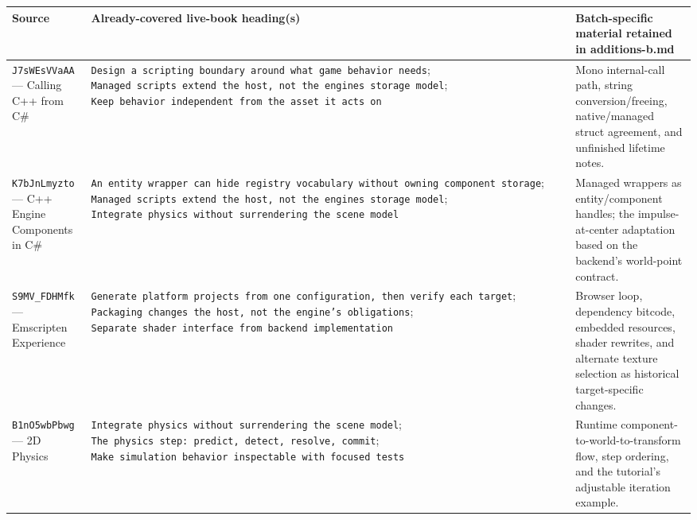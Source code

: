 {\def\LTcaptype{none} %
\begin{longtable}[]{@{}
  >{\raggedright\arraybackslash}p{}
  >{\raggedright\arraybackslash}p{}
  >{\raggedright\arraybackslash}p{}@{}}
\toprule\noalign{}
\begin{minipage}[b]{\linewidth}\raggedright
Source
\end{minipage} & \begin{minipage}[b]{\linewidth}\raggedright
Already-covered live-book heading(s)
\end{minipage} & \begin{minipage}[b]{\linewidth}\raggedright
Batch-specific material retained in additions-b.md
\end{minipage} \\
\midrule\noalign{}
\endhead
\bottomrule\noalign{}
\endlastfoot
\texttt{J7sWEsVVaAA} --- Calling C++ from C\# & \texttt{Design\ a\ scripting\ boundary\ around\ what\ game\ behavior\ needs}; \texttt{Managed\ scripts\ extend\ the\ host,\ not\ the\ engine\textquotesingle{}s\ storage\ model}; \texttt{Keep\ behavior\ independent\ from\ the\ asset\ it\ acts\ on} & Mono internal-call path, string conversion/freeing, native/managed struct agreement, and unfinished lifetime notes. \\
\texttt{K7bJnLmyzto} --- C++ Engine Components in C\# & \texttt{An\ entity\ wrapper\ can\ hide\ registry\ vocabulary\ without\ owning\ component\ storage}; \texttt{Managed\ scripts\ extend\ the\ host,\ not\ the\ engine\textquotesingle{}s\ storage\ model}; \texttt{Integrate\ physics\ without\ surrendering\ the\ scene\ model} & Managed wrappers as entity/component handles; the impulse-at-center adaptation based on the backend's world-point contract. \\
\texttt{S9MV\_FDHMfk} --- Emscripten Experience & \texttt{Generate\ platform\ projects\ from\ one\ configuration,\ then\ verify\ each\ target}; \texttt{Packaging\ changes\ the\ host,\ not\ the\ engine’s\ obligations}; \texttt{Separate\ shader\ interface\ from\ backend\ implementation} & Browser loop, dependency bitcode, embedded resources, shader rewrites, and alternate texture selection as historical target-specific changes. \\
\texttt{B1nO5wbPbwg} --- 2D Physics & \texttt{Integrate\ physics\ without\ surrendering\ the\ scene\ model}; \texttt{The\ physics\ step:\ predict,\ detect,\ resolve,\ commit}; \texttt{Make\ simulation\ behavior\ inspectable\ with\ focused\ tests} & Runtime component-to-world-to-transform flow, step ordering, and the tutorial's adjustable iteration example. \\

\end{longtable}}

